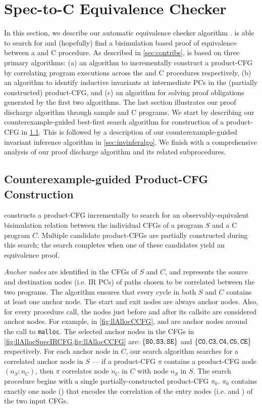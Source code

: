\section{Spec-to-C Equivalence Checker}
\label{sec:spectocalgo}
In this section, we describe our automatic equivalence checker algorithm \toolName{}.
\toolName{} is able to search for and (hopefully) find a bisimulation based proof of equivalence
between a \SpecL{} and C procedure.
As described in \cref{sec:contribs}, \toolName{} is based on three primary algorithms:
(a) an algorithm to incrementally construct a product-CFG by correlating program executions across
the \SpecL{} and C procedures respectively,
(b) an algorithm to identify inductive invariants at intermediate PCs in the (partially constructed)
product-CFG, and (c) an algorithm for solving proof obligations generated by the first two algorithms.
The last section illustrates our proof discharge algorithm through sample \SpecL{} and C programs.
We start by describing our counterexample-guided best-first search algorithm for
construction of a product-CFG in \cref{sec:searchalgo}.
This is followed by a description of our counterexample-guided invariant inference algorithm in \cref{sec:invinferalgo}.
We finish with a comprehensive analysis of our proof discharge algorithm and its related subprocedures.

\subsection{Counterexample-guided Product-CFG Construction}
\label{sec:searchalgo}
\toolName{} constructs a product-CFG incrementally to search for an observably-equivalent
bisimulation relation between the individual CFGs of a \SpecL{} program $S$ and a C program $C$.
Multiple candidate product-CFGs are partially constructed during this search;
the search completes when one of these candidates yield an equivalence proof.

{\em Anchor nodes} are identified in the CFGs of $S$ and $C$, and represents the source and destination nodes (i.e. IR PCs)
of paths chosen to be correlated between the two programs.
The algorithm ensures that every cycle in both $S$ and $C$ contains at least one anchor node.
The start and exit nodes are always anchor nodes.
Also, for every procedure call, the nodes just before and after its callsite are considered anchor nodes.
For example, in \cref{fig:llAllocCCFG},  and  are anchor nodes around the call to {\tt malloc}.
The selected anchor nodes in the CFGs in \cref{fig:llAllocSpecIRCFG,fig:llAllocCCFG} are:
$\{ {\tt S0},{\tt S3},{\tt SE} \}$ and $\{ {\tt C0}, {\tt C3}, {\tt C4}, {\tt C5}, {\tt CE} \}$ respectively.
For each anchor node in $C$, our search algorithm searches for a correlated anchor node in $S$ --- if
a product-CFG $\pi$ contains a product-CFG node  $(n_S\!:\!n_C)$, then $\pi$
correlates node $n_C$ in $C$ with node $n_S$ in $S$.
The search procedure begins with a single partially-constructed product-CFG $\pi_0$.
$\pi_0$ contains exactly one node () that encodes the correlation of the entry nodes
(i.e.  and ) of the two input CFGs.

